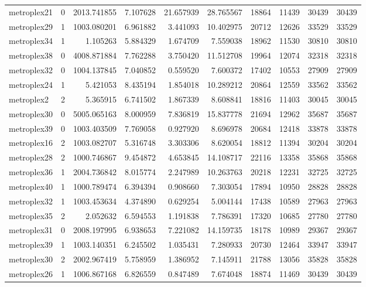 \begin{longtable}{|l|r|r|r|r|r|r|r|r|r|}
metroplex21 & 0 & 2013.741855 & 7.107628 & 21.657939 & 28.765567 & 18864 & 11439 & 30439 & 30439 \\
metroplex29 & 1 & 1003.080201 & 6.961882 & 3.441093 & 10.402975 & 20712 & 12626 & 33529 & 33529 \\
metroplex34 & 1 & 1.105263 & 5.884329 & 1.674709 & 7.559038 & 18962 & 11530 & 30810 & 30810 \\
metroplex38 & 0 & 4008.871884 & 7.762288 & 3.750420 & 11.512708 & 19964 & 12074 & 32318 & 32318 \\
metroplex32 & 0 & 1004.137845 & 7.040852 & 0.559520 & 7.600372 & 17402 & 10553 & 27909 & 27909 \\
metroplex24 & 1 & 5.421053 & 8.435194 & 1.854018 & 10.289212 & 20864 & 12559 & 33562 & 33562 \\
metroplex2 & 2 & 5.365915 & 6.741502 & 1.867339 & 8.608841 & 18816 & 11403 & 30045 & 30045 \\
metroplex30 & 0 & 5005.065163 & 8.000959 & 7.836819 & 15.837778 & 21694 & 12962 & 35687 & 35687 \\
metroplex39 & 0 & 1003.403509 & 7.769058 & 0.927920 & 8.696978 & 20684 & 12418 & 33878 & 33878 \\
metroplex16 & 2 & 1003.082707 & 5.316748 & 3.303306 & 8.620054 & 18812 & 11394 & 30204 & 30204 \\
metroplex28 & 2 & 1000.746867 & 9.454872 & 4.653845 & 14.108717 & 22116 & 13358 & 35868 & 35868 \\
metroplex36 & 1 & 2004.736842 & 8.015774 & 2.247989 & 10.263763 & 20218 & 12231 & 32725 & 32725 \\
metroplex40 & 1 & 1000.789474 & 6.394394 & 0.908660 & 7.303054 & 17894 & 10950 & 28828 & 28828 \\
metroplex32 & 1 & 1003.453634 & 4.374890 & 0.629254 & 5.004144 & 17438 & 10589 & 27963 & 27963 \\
metroplex35 & 2 & 2.052632 & 6.594553 & 1.191838 & 7.786391 & 17320 & 10685 & 27780 & 27780 \\
metroplex31 & 0 & 2008.197995 & 6.938653 & 7.221082 & 14.159735 & 18178 & 10989 & 29367 & 29367 \\
metroplex39 & 1 & 1003.140351 & 6.245502 & 1.035431 & 7.280933 & 20730 & 12464 & 33947 & 33947 \\
metroplex30 & 2 & 2002.967419 & 5.758959 & 1.386952 & 7.145911 & 21788 & 13056 & 35828 & 35828 \\
metroplex26 & 1 & 1006.867168 & 6.826559 & 0.847489 & 7.674048 & 18874 & 11469 & 30439 & 30439 \\

\end{longtable}
